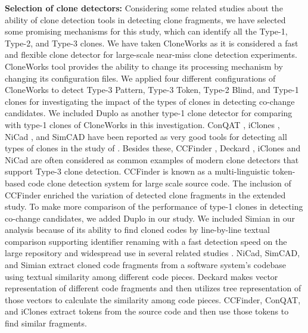\documentclass[review]{elsarticle}
\begin{document}
\textbf{Selection of clone detectors:} Considering some related studies about the ability of clone detection tools in detecting clone fragments, we have selected some promising mechanisms for this study, which can identify all the Type-1, Type-2, and Type-3 clones. We have taken CloneWorks \cite{CloneWorks-Jeff} as it is considered a fast and flexible clone detector for large-scale near-miss clone detection experiments. CloneWorks tool provides the ability to change its processing mechanism by changing its configuration files. We applied four different configurations of CloneWorks to detect Type-3 Pattern, Type-3 Token, Type-2 Blind, and Type-1 clones for investigating the impact of the types of clones in detecting co-change candidates. We included Duplo \cite{DuploCloneDetection} as another type-1 clone detector for comparing with type-1 clones of CloneWorks in this investigation.  ConQAT \cite{conqat-clone-detecion}, iClones \cite{4812755iclones}, NiCad \cite{5970189Nicad}, and SimCAD \cite{6613857Simcad} have been reported as very good tools for detecting all types of clones in the study of \citet{jeff-evaluating}. Besides these, CCFinder \cite{CCFinderCloneDetection}, Deckard \cite{4222572Deckard}, iClones and NiCad are often considered as common examples of modern clone detectors that support Type-3 clone detection. CCFinder is known as a multi-linguistic token-based code clone detection system for large scale source code. The inclusion of CCFinder enriched the variation of detected clone fragments in the extended study.  To make more comparison of the performance of type-1 clones in detecting co-change candidates, we added Duplo in our study. We included Simian \cite{simianlink} in our analysis because of its ability to find cloned codes by line-by-line textual comparison supporting identifier renaming with a fast detection speed on the large repository and widespread use in several related studies \cite{simian-used-1, Wang-2013-SBC-2491411-2491420, impact-clone-maintenance, Cheung-clones-javascript, cloning-gnome-project}. NiCad, SimCAD, and Simian extract cloned code fragments from a software system's codebase using textual similarity among different code pieces. Deckard makes vector representation of different code fragments and then utilizes tree representation of those vectors to calculate the similarity among code pieces.  CCFinder, ConQAT, and iClones extract tokens from the source code and then use those tokens to find similar fragments.
\end{document}
